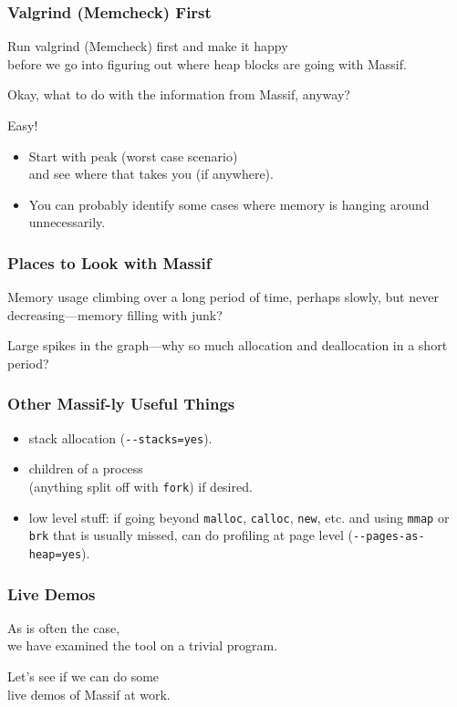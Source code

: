 \begin{frame}
\frametitle{Valgrind (Memcheck) First}

\large
\begin{changemargin}{2cm}
Run valgrind (Memcheck) first and make it happy \\
before we go into figuring out where heap blocks are going with Massif. 

Okay, what to do with the information from Massif, anyway? 

Easy!
\begin{itemize}
\item Start with peak (worst case scenario) \\ and see where that takes you (if anywhere). 

\item You can probably identify some cases where memory is hanging around unnecessarily. 
\end{itemize}
\end{changemargin}


\end{frame}


\begin{frame}
\frametitle{Places to Look with Massif}

\large
\begin{changemargin}{2cm}
Memory usage climbing over a long period of time, perhaps slowly, but never decreasing---memory filling with junk? 

Large spikes in the graph---why so much allocation and deallocation in a short period?
\end{changemargin}
\end{frame}



\begin{frame}[fragile]
\frametitle{Other Massif-ly Useful Things}

\large
\begin{changemargin}{2cm}
\begin{itemize}
	\item stack allocation (\verb+--stacks=yes+).
	\item children of a process \\ (anything split off with \texttt{fork}) if desired.
	\item low level stuff: if going beyond \texttt{malloc}, \texttt{calloc}, \texttt{new}, etc. and using \texttt{mmap} or \texttt{brk} that is usually missed, can do profiling at page level (\verb+--pages-as-heap=yes+).
\end{itemize}
\end{changemargin}

\end{frame}




\begin{frame}
\frametitle{Live Demos}

\large
\begin{changemargin}{2cm}
As is often the case, \\ we have examined the tool on a trivial program. 

Let's see if we can do some\\
 live demos of Massif at work.
\end{changemargin}
\end{frame}




